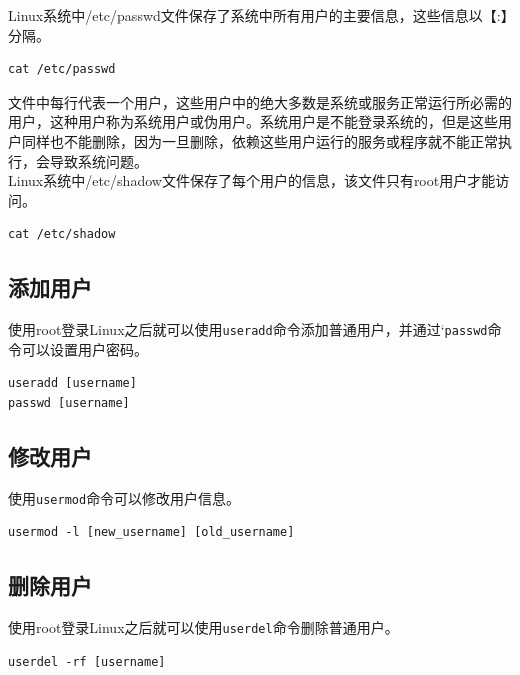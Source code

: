 \documentclass[12pt, openany, oneside]{book}
\begin{document}
Linux系统中/etc/passwd文件保存了系统中所有用户的主要信息，这些信息以【:】分隔。

\vspace{-0.5cm}
\begin{lstlisting}
cat /etc/passwd
\end{lstlisting}

文件中每行代表一个用户，这些用户中的绝大多数是系统或服务正常运行所必需的用户，这种用户称为系统用户或伪用户。系统用户是不能登录系统的，但是这些用户同样也不能删除，因为一旦删除，依赖这些用户运行的服务或程序就不能正常执行，会导致系统问题。 \\

Linux系统中/etc/shadow文件保存了每个用户的信息，该文件只有root用户才能访问。

\vspace{-0.5cm}
\begin{lstlisting}
cat /etc/shadow
\end{lstlisting}

\subsection{添加用户}

使用root登录Linux之后就可以使用\lstinline|useradd|命令添加普通用户，并通过`\lstinline|passwd|命令可以设置用户密码。

\vspace{-0.5cm}
\begin{lstlisting}
useradd [username]
passwd [username]
\end{lstlisting}

\subsection{修改用户}

使用\lstinline|usermod|命令可以修改用户信息。

\vspace{-0.5cm}
\begin{lstlisting}
usermod -l [new_username] [old_username]
\end{lstlisting}

\subsection{删除用户}

使用root登录Linux之后就可以使用\lstinline|userdel|命令删除普通用户。

\vspace{-0.5cm}
\begin{lstlisting}
userdel -rf [username]
\end{lstlisting}
\end{document}
